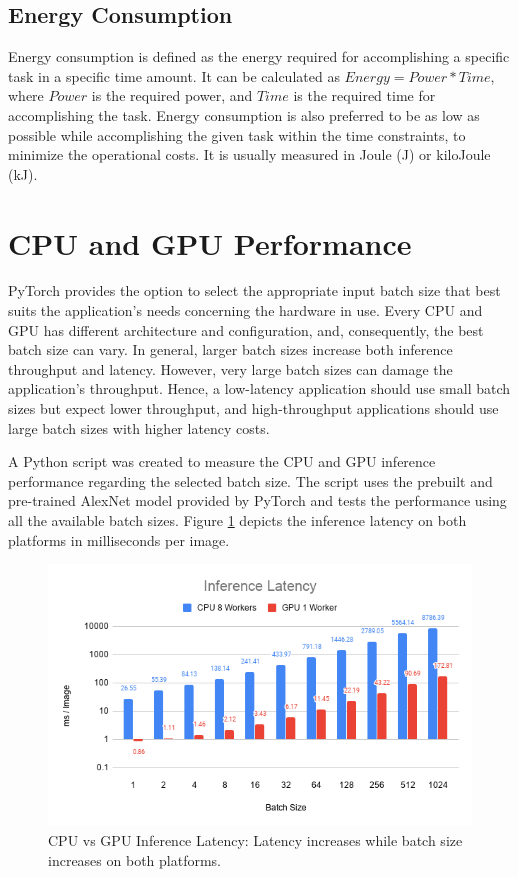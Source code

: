 \subsection{Energy Consumption}
Energy consumption is defined as the energy required for accomplishing a specific task in a specific time amount. It can be calculated as $Energy = Power * Time$, where $Power$ is the required power, and $Time$ is the required time for accomplishing the task. Energy consumption is also preferred to be as low as possible while accomplishing the given task within the time constraints, to minimize the operational costs. It is usually measured in Joule (J) or kiloJoule (kJ).

\section{CPU and GPU Performance}
PyTorch provides the option to select the appropriate input batch size that best suits the application's needs concerning the hardware in use. Every CPU and GPU has different architecture and configuration, and, consequently, the best batch size can vary. In general, larger batch sizes increase both inference throughput and latency. However, very large batch sizes can damage the application's throughput. Hence, a low-latency application should use small batch sizes but expect lower throughput, and high-throughput applications should use large batch sizes with higher latency costs.

A Python script was created to measure the CPU and GPU inference performance regarding the selected batch size. The script uses the prebuilt and pre-trained AlexNet model provided by PyTorch and tests the performance using all the available batch sizes. Figure \ref{fig:CPU-vs-GPU-Inference-Latency} depicts the inference latency on both platforms in milliseconds per image.

\begin{figure} [H]
	\centering
	\includegraphics[width=\textwidth]{../Images/Results/CPU-GPU-Inference-Latency.png}
	\decoRule
	\caption[CPU vs GPU Inference Latency]{CPU vs GPU Inference Latency: Latency increases while batch size increases on both platforms.}
	\label{fig:CPU-vs-GPU-Inference-Latency}
\end{figure}

